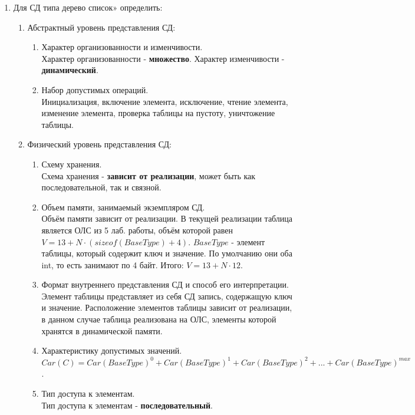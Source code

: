 \documentclass[a4paper,14pt]{extarticle}
\begin{document}
\begin{enumerate}
	\item Для СД типа дерево список» определить:
	      \begin{enumerate}[label*=\arabic*.]
		      \item Абстрактный уровень представления СД:

		            \begin{enumerate}[label*=\arabic*.]
			            \item Характер организованности и изменчивости.\\
			            Характер организованности - \textbf{множество}. Характер изменчивости - \textbf{динамический}.
			            \item Набор допустимых операций.\\
			            Инициализация, включение элемента, исключение, чтение элемента, изменение 
                        элемента, проверка таблицы на пустоту, уничтожение таблицы.
		            \end{enumerate}

		      \item Физический уровень представления СД:

		            \begin{enumerate}[label*=\arabic*.]
			            \item Схему хранения.\\
			            Схема хранения - \textbf{зависит от реализации}, может быть как последовательной, так и связной.
			            \item Объем памяти, занимаемый экземпляром СД.\\
			            Объём памяти зависит от реализации. В текущей реализации
                        таблица является ОЛС из 5 лаб. работы, объём которой равен 
                        $V = 13 + N\cdot(sizeof(BaseType) + 4)$. $BaseType$ - элемент
                        таблицы, который содержит ключ и значение. По умолчанию они оба int, 
                        то есть занимают по 4 байт. Итого:
                        $V = 13 + N\cdot12$.
			            \item Формат внутреннего представления СД и способ его интерпретации.\\
			            Элемент таблицы представляет из себя СД запись, содержащую ключ и значение. Расположение
                        элементов таблицы зависит от реализации, в данном случае таблица реализована на ОЛС, элементы
                        которой хранятся в динамической памяти.  
			            \item Характеристику допустимых значений.\\
			            $Car(C) = Car(BaseType) ^ 0 + Car(BaseType) ^ 1 + Car(BaseType) ^ 2 + ... + Car(BaseType) ^ {max}$.
			            \item Тип доступа к элементам.\\
						Тип доступа к элементам - \textbf{последовательный}.
		            \end{enumerate}


\end{enumerate}
\end{enumerate}
\end{document}
